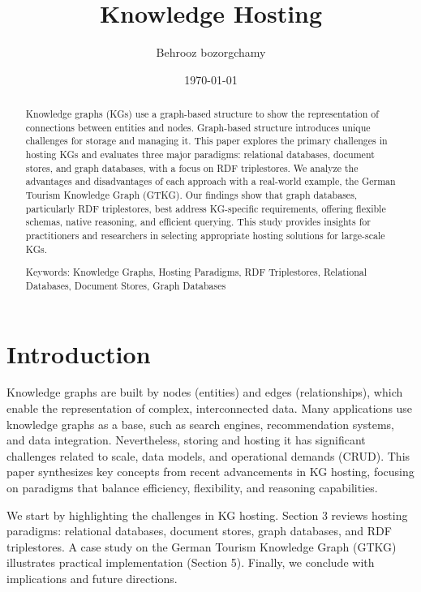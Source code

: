 \documentclass[12pt]{article}
\begin{document}
\title{Knowledge Hosting}
\author{Behrooz bozorgchamy}
\date{\today}
\maketitle{}
\begin{abstract}
Knowledge graphs (KGs) use a graph-based structure to show the representation of connections between entities and nodes. Graph-based structure introduces unique challenges for storage and managing it. This paper explores the primary challenges in hosting KGs and evaluates three major paradigms: relational databases, document stores, and graph databases, with a focus on RDF triplestores. We analyze the advantages and disadvantages of each approach with a real-world example, the German Tourism Knowledge Graph (GTKG). Our findings show that graph databases, particularly RDF triplestores, best address KG-specific requirements, offering flexible schemas, native reasoning, and efficient querying. This study provides insights for practitioners and researchers in selecting appropriate hosting solutions for large-scale KGs.

Keywords: Knowledge Graphs, Hosting Paradigms, RDF Triplestores, Relational Databases, Document Stores, Graph Databases
\end{abstract}

\section{Introduction}
Knowledge graphs are built by nodes (entities) and edges (relationships), which enable the representation of complex, interconnected data. Many applications use knowledge graphs as a base, such as search engines, recommendation systems, and data integration. Nevertheless, storing and hosting it has significant challenges related to scale, data models, and operational demands (CRUD). This paper synthesizes key concepts from recent advancements in KG hosting, focusing on paradigms that balance efficiency, flexibility, and reasoning capabilities.

We start by highlighting the challenges in KG hosting. Section 3 reviews hosting paradigms: relational databases, document stores, graph databases, and RDF triplestores. A case study on the German Tourism Knowledge Graph (GTKG) illustrates practical implementation (Section 5). Finally, we conclude with implications and future directions.
\end{document}
